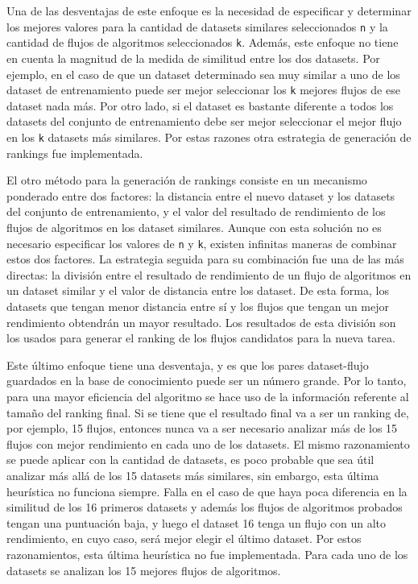 Una de las desventajas de este enfoque es la necesidad de especificar y determinar los mejores valores para la cantidad de datasets similares seleccionados \texttt{n} y la cantidad de flujos de algoritmos seleccionados \texttt{k}. Además, este enfoque no tiene en cuenta la magnitud de la medida de similitud entre los dos datasets. Por ejemplo, en el caso de que un dataset determinado sea muy similar a uno de los dataset de entrenamiento puede ser mejor seleccionar los \texttt{k} mejores flujos de ese dataset nada más. Por otro lado, si el dataset es bastante diferente a todos los datasets del conjunto de entrenamiento debe ser mejor seleccionar el mejor flujo en los \texttt{k} datasets más similares. Por estas razones otra estrategia de generación de rankings fue implementada. 

El otro método para la generación de rankings consiste en un mecanismo ponderado entre dos factores: la distancia entre el nuevo dataset y los datasets del conjunto de entrenamiento, y el valor del resultado de rendimiento de los flujos de algoritmos en los dataset similares. Aunque con esta solución no es necesario especificar los valores de \texttt{n} y \texttt{k}, existen infinitas maneras de combinar estos dos factores. La estrategia seguida para su combinación fue una de las más directas: la división entre el resultado de rendimiento de un flujo de algoritmos en un dataset similar y el valor de distancia entre los dataset. De esta forma, los datasets que tengan menor distancia entre sí y los flujos que tengan un mejor rendimiento obtendrán un mayor resultado. Los resultados de esta división son los usados para generar el ranking de los flujos candidatos para la nueva tarea.

Este último enfoque tiene una desventaja, y es que los pares dataset-flujo guardados en la base de conocimiento puede ser un número grande. Por lo tanto, para una mayor eficiencia del algoritmo se hace uso de la información referente al tamaño del ranking final. Si se tiene que el resultado final va a ser un ranking de, por ejemplo, 15 flujos, entonces nunca va a ser necesario analizar más de los 15 flujos con mejor rendimiento en cada uno de los datasets. El mismo razonamiento se puede aplicar con la cantidad de datasets, es poco probable que sea útil analizar más allá de los 15 datasets más similares, sin embargo, esta última heurística no funciona siempre. Falla en el caso de que haya poca diferencia en la similitud de los 16 primeros datasets y además los flujos de algoritmos probados tengan una puntuación baja, y luego el dataset 16 tenga un flujo con un alto rendimiento, en cuyo caso, será mejor elegir el último dataset. Por estos razonamientos, esta última heurística no fue implementada. Para cada uno de los datasets se analizan los 15 mejores flujos de algoritmos.

